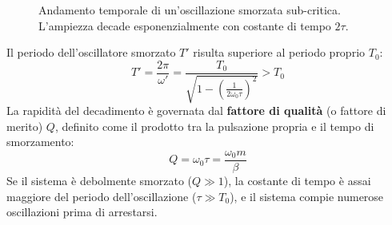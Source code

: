 \begin{figure}[ht]
\centering
{}
\caption{Andamento temporale di un'oscillazione smorzata sub-critica. L'ampiezza decade esponenzialmente con costante di tempo $2\tau$.}
\end{figure}

Il periodo dell'oscillatore smorzato $T'$ risulta superiore al periodo proprio $T_0$:
\begin{equation}
    T' = \frac{2\pi}{\omega'} = \frac{T_0}{\sqrt{1 - \left(\frac{1}{2\omega_0\tau}\right)^2}} > T_0
\end{equation}
La rapidità del decadimento è governata dal \textbf{fattore di qualità} (o fattore di merito) $Q$, definito come il prodotto tra la pulsazione propria e il tempo di smorzamento:
\begin{equation}
    Q = \omega_0 \tau = \frac{\omega_0 m}{\beta}
\end{equation}
Se il sistema è debolmente smorzato ($Q \gg 1$), la costante di tempo è assai maggiore del periodo dell'oscillazione ($\tau \gg T_0$), e il sistema compie numerose oscillazioni prima di arrestarsi.

